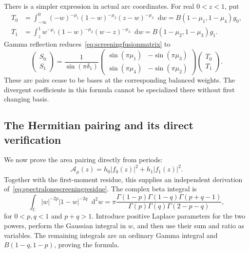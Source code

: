 \documentclass[11pt,a4paper]{article}
\numberwithin{equation}{section}
\theoremstyle{definition}
\theoremstyle{remark}
\newcommand{\dd}{\mathop{}\!\mathrm d}
\newcommand{\T}{\mathcal T}
\newcommand{\CC}{\mathbb C}
\begin{document}
There is a simpler expression in actual arc coordinates.
For real $0<z<1$, put
\begin{align*}
 T_0&=\int_{-\infty}^0
  (-w)^{-\mu_1}(1-w)^{-\mu_2}(z-w)^{-\mu_3}\dd w
       =B(1-\mu_1,1-\mu_4)g_0,\\
 T_1&=\int_z^1
  w^{-\mu_1}(1-w)^{-\mu_2}(w-z)^{-\mu_3}\dd w
       =B(1-\mu_2,1-\mu_3)g_1.
\end{align*}
Gamma reflection reduces~\eqref{eq:screeningfusionmatrix} to
\begin{equation}
 \boxed{\quad
 \begin{pmatrix}S_0\\S_1\end{pmatrix}
 =\frac1{\sin(\pi\delta_1)}
 \begin{pmatrix}
 \sin(\pi\mu_1)&-\sin(\pi\mu_3)\\
 \sin(\pi\mu_4)&-\sin(\pi\mu_2)
 \end{pmatrix}
 \begin{pmatrix}T_0\\T_1\end{pmatrix}.
 \quad}
 \label{eq:screeningsinefusion}
\end{equation}
These arc pairs cease to be bases at the corresponding
balanced weights. The divergent coefficients in this formula
cannot be specialized there without first changing basis.

\subsection{The Hermitian pairing and its direct verification}

We now prove the area pairing directly from periods:
\begin{equation}
 \boxed{\quad
 \mathcal A_\mu(z)=h_0|f_0(z)|^2+h_1|f_1(z)|^2.
 \quad}
 \label{eq:screeningareapairing}
\end{equation}
Together with the first-moment residue, this supplies an
independent derivation of~\eqref{eq:spectralonescreeningresidue}.
The complex beta integral is
\begin{equation}
 \int_{\CC}|w|^{-2p}|1-w|^{-2q}\dd^2w
 =\pi\frac{\Gamma(1-p)\Gamma(1-q)\Gamma(p+q-1)}
             {\Gamma(p)\Gamma(q)\Gamma(2-p-q)},
 \label{eq:complexbetaintegral}
\end{equation}
for $0<p,q<1$ and $p+q>1$. Introduce positive Laplace
parameters for the two powers, perform the Gaussian integral
in $w$, and then use their sum and ratio as variables. The
remaining integrals are an ordinary Gamma integral and
$B(1-q,1-p)$, proving the formula.
\end{document}
